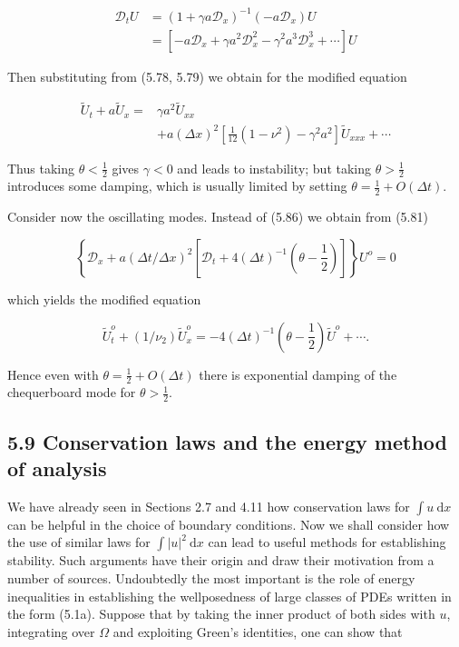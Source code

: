 \documentclass[10pt]{article}
\begin{document}
\[
\begin{aligned}
\mathcal{D}_{t} U & =\left(1+\gamma a \mathcal{D}_{x}\right)^{-1}\left(-a \mathcal{D}_{x}\right) U \\
& =\left[-a \mathcal{D}_{x}+\gamma a^{2} \mathcal{D}_{x}^{2}-\gamma^{2} a^{3} \mathcal{D}_{x}^{3}+\cdots\right] U
\end{aligned}
\]

Then substituting from (5.78, 5.79) we obtain for the modified equation

\[
\begin{aligned}
\tilde{U}_{t}+a \tilde{U}_{x}= & \gamma a^{2} \tilde{U}_{x x} \\
& +a(\Delta x)^{2}\left[\frac{1}{12}\left(1-\nu^{2}\right)-\gamma^{2} a^{2}\right] \tilde{U}_{x x x}+\cdots
\end{aligned}
\]

Thus taking \(\theta<\frac{1}{2}\) gives \(\gamma<0\) and leads to instability; but taking \(\theta>\frac{1}{2}\) introduces some damping, which is usually limited by setting \(\theta=\frac{1}{2}+O(\Delta t)\).

Consider now the oscillating modes. Instead of (5.86) we obtain from (5.81)

\[
\left\{\mathcal{D}_{x}+a(\Delta t / \Delta x)^{2}\left[\mathcal{D}_{t}+4(\Delta t)^{-1}\left(\theta-\frac{1}{2}\right)\right]\right\} U^{o}=0
\]

which yields the modified equation

\[
\tilde{U}_{t}^{o}+\left(1 / \nu_{2}\right) \tilde{U}_{x}^{o}=-4(\Delta t)^{-1}\left(\theta-\frac{1}{2}\right) \tilde{U}^{o}+\cdots .
\]

Hence even with \(\theta=\frac{1}{2}+O(\Delta t)\) there is exponential damping of the chequerboard mode for \(\theta>\frac{1}{2}\).

\subsection*{5.9 Conservation laws and the energy method of analysis}
We have already seen in Sections 2.7 and 4.11 how conservation laws for \(\int u \mathrm{~d} x\) can be helpful in the choice of boundary conditions. Now we shall consider how the use of similar laws for \(\int|u|^{2} \mathrm{~d} x\) can lead to useful methods for establishing stability. Such arguments have their origin and draw their motivation from a number of sources. Undoubtedly the most important is the role of energy inequalities in establishing the wellposedness of large classes of PDEs written in the form (5.1a). Suppose that by taking the inner product of both sides with \(u\), integrating over \(\Omega\) and exploiting Green's identities, one can show that
\end{document}
